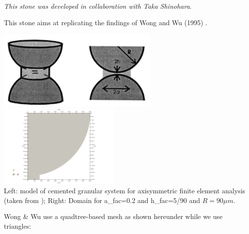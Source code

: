 



{\sl This stone was developed in collaboration with Taka Shinohara}.

This stone aims at replicating the findings of Wong and Wu (1995) \cite{wowu95}.

\begin{center}
\includegraphics[width=8cm]{python_codes/fieldstone_63/images/yoyo}
\includegraphics[width=6cm]{python_codes/fieldstone_63/images/domain}\\
{\captionfont Left: model of cemented granular system for 
axisymmetric finite element analysis (taken from \cite{wowu95}); Right: 
Domain for a\_fac=0.2 and h\_fac=5/90 and $R=90\mu m$.}
\end{center}

Wong \& Wu use a quadtree-based mesh as shown hereunder while we 
use triangles:

